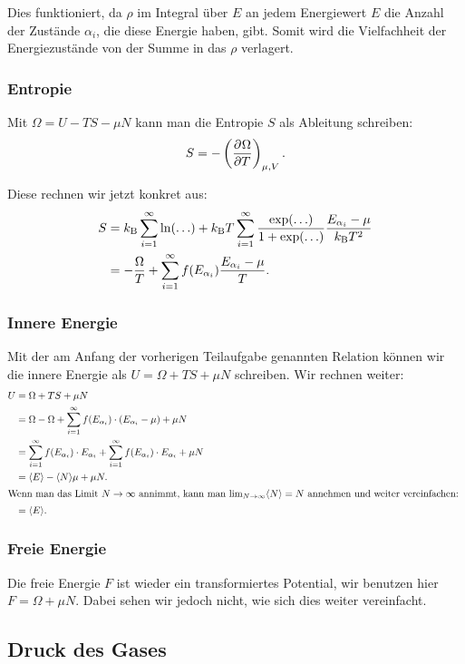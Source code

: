 Dies funktioniert, da $\rho$ im Integral über $E$ an jedem Energiewert $E$ die
Anzahl der Zustände $\alpha_i$, die diese Energie haben, gibt. Somit wird die
Vielfachheit der Energiezustände von der Summe in das $\rho$ verlagert.

\subsubsection{Entropie}

Mit $\Omega = U - TS - \mu N$ kann man die Entropie $S$ als Ableitung schreiben:
\[
    S = - \tdpd\Omega T{\mu, V}.
\]

Diese rechnen wir jetzt konkret aus:
\begin{align*}
    S &= k_\text B \sum_{i=1}^\infty \ln(\ldots) + k_\text B T \sum_{i=1}^\infty \frac{\exp(\ldots)}{1 + \exp(\ldots)} \frac{E_{\alpha_i} - \mu}{k_\text B T^2} \\
      &= - \frac\Omega T + \sum_{i=1}^\infty f(E_{\alpha_i}) \frac{E_{\alpha_i} - \mu}T.
\end{align*}

\subsubsection{Innere Energie}

Mit der am Anfang der vorherigen Teilaufgabe genannten Relation können wir die innere Energie als $U = \Omega + TS + \mu N$ schreiben. Wir rechnen weiter:
\begin{align*}
    U &= \Omega + TS + \mu N \\
      &= \Omega - \Omega + \isum f(\Eai) \cdot (\Eai - \mu) + \mu N \\
      &= \isum f(\Eai) \cdot \Eai + \isum f(\Eai) \cdot \Eai + \mu N \\
      &= \bracket E - \bracket N \mu + \mu N. \\
    \intertext{%
        Wenn man das Limit $N \to \infty$ annimmt, kann man $\lim_{N\to\infty}
        \bracket N = N$ annehmen und weiter vereinfachen:
    }
      &= \bracket E.
\end{align*}

\subsubsection{Freie Energie}

Die freie Energie $F$ ist wieder ein transformiertes Potential, wir benutzen
hier $F = \Omega + \mu N$. Dabei sehen wir jedoch nicht, wie sich dies weiter
vereinfacht.

\subsection{Druck des Gases}

